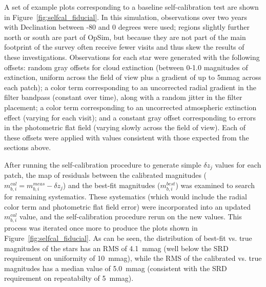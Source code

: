 \documentclass[12pt,preprint]{aastex}
\begin{document}
A set of example plots corresponding to a baseline self-calibration
test are shown in Figure~\ref{fig:selfcal_fiducial}.  In this
simulation, observations over two years with Declination between -80
and 0 degrees were used; regions slightly further north or south are
part of OpSim, but because they are not part of the main footprint of
the survey often receive fewer visits and thus skew the results of
these investigations. Observations for each star were generated with
the following offsets: random gray offsets for cloud extinction
(between 0-1.0 magnitudes of extinction, uniform across the field of
view plus a gradient of up to 5mmag across each patch); a color term
corresponding to an uncorrected radial gradient in the filter bandpass
(constant over time), along with a random jitter in the filter
placement; a color term corresponding to an uncorrected atmospheric
extinction effect (varying for each visit); and a constant gray offset
corresponding to errors in the photometric flat field (varying slowly
across the field of view). Each of these offsets were applied with
values consistent with those expected from the sections above.

 After running the self-calibration procedure to generate simple
$\delta z_j$ values for each patch, the map of residuals between the
calibrated magnitudes ($m_{b,i}^{cal} = m_{b,i}^{meas} - \delta z_j$)
and the best-fit magnitudes ($m_{b,i}^{best}$) was examined to search
for remaining systematics. These systematics (which would include the
radial color term and photometric flat field error) were incorporated
into an updated $m_{b,i}^{cal}$ value, and the self-calibration
procedure rerun on the new values. This process was iterated once more
to produce the plots shown in Figure~\ref{fig:selfcal_fiducial}. As
can be seen, the distribution of best-fit vs. true magnitudes of the
stars has an RMS of 4.1~mmag (well below the SRD requirement on
uniformity of 10~mmag), while the RMS of the calibrated vs. true
magnitudes has a median value of 5.0~mmag (consistent with the SRD
requirement on repeatabilty of 5~mmag).
\end{document}
